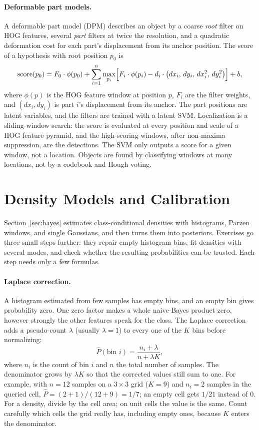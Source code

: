 \paragraph{Deformable part models.}
A deformable part model (DPM) describes an object by a coarse \emph{root}
filter on HOG features, several \emph{part} filters at twice the resolution,
and a quadratic deformation cost for each part's displacement from its anchor
position. The score of a hypothesis with root position $p_0$ is
\begin{equation}
  \mathrm{score}(p_0) = F_0\cdot\phi(p_0)
  + \sum_{i=1}^{n} \max_{p_i}\Bigl[F_i\cdot\phi(p_i)
  - d_i\cdot\bigl(dx_i,\,dy_i,\,dx_i^2,\,dy_i^2\bigr)\Bigr] + b,
\end{equation}
\noindent
where $\phi(p)$ is the HOG feature window at position $p$, $F_i$ are the filter
weights, and $(dx_i,dy_i)$ is part $i$'s displacement from its anchor. The part
positions are latent variables, and the filters are trained with a latent SVM.
Localization is a sliding-window search: the score is evaluated at every
position and scale of a HOG feature pyramid, and the high-scoring windows,
after non-maxima suppression, are the detections. The SVM only outputs a score
for a given window, not a location. Objects are found by classifying windows at
many locations, not by a codebook and Hough voting.

\section{Density Models and Calibration}
\label{app:gmm}

Section~\ref{sec:bayes} estimates class-conditional densities with histograms,
Parzen windows, and single Gaussians, and then turns them into posteriors.
Exercises go three small steps further: they repair empty histogram bins, fit
densities with several modes, and check whether the resulting probabilities can
be trusted. Each step needs only a few formulas.

\paragraph{Laplace correction.}
A histogram estimated from few samples has empty bins, and an empty bin gives
probability zero. One zero factor makes a whole naive-Bayes product zero, however
strongly the other features speak for the class. The Laplace correction adds a
pseudo-count $\lambda$ (usually $\lambda = 1$) to every one of the $K$ bins before
normalizing:
\begin{equation}
  \hat P(\text{bin } i) = \frac{n_i + \lambda}{n + \lambda K},
\end{equation}
\noindent
where $n_i$ is the count of bin $i$ and $n$ the total number of samples. The
denominator grows by $\lambda K$ so that the corrected values still sum to one.
For example, with $n = 12$ samples on a $3\times 3$ grid ($K = 9$) and $n_i = 2$
samples in the queried cell, $\hat P = (2+1)/(12+9) = 1/7$; an empty cell gets
$1/21$ instead of $0$. For a density, divide by the cell area; on unit cells
the value is the same. Count carefully which cells the grid really has,
including empty ones, because $K$ enters the denominator.

